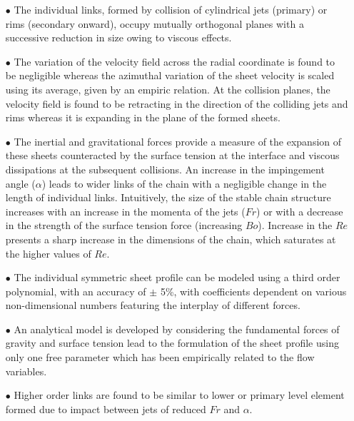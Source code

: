\begin{enumerate}
\item [$\bullet$] The individual links, formed by collision of cylindrical jets (primary) or rims (secondary onward), occupy mutually orthogonal planes with a successive reduction in size owing to viscous effects. 
\item [$\bullet$] The variation of the velocity field across the radial coordinate is found to be negligible whereas the azimuthal variation of the sheet velocity is scaled using its average, given by an empiric relation. At the collision planes, the velocity field is found to be retracting in the direction of the colliding jets and rims whereas it is expanding in the plane of the formed sheets.
\item [$\bullet$] The inertial and gravitational forces provide a measure of the expansion of these sheets counteracted by the surface tension at the interface and viscous dissipations at the subsequent collisions. An increase in the impingement angle ($\alpha$) leads to wider links of the chain with a negligible change in the length of individual links. Intuitively, the size of the stable chain structure increases with an increase in the momenta of the jets ($Fr$) or with a decrease in the strength of the surface tension force (increasing $Bo$). Increase in the $Re$ presents a sharp increase in the dimensions of the chain, which saturates at the higher values of $Re$.
\item [$\bullet$] The individual symmetric sheet profile can be modeled using a third order polynomial, with an accuracy of $\pm$ 5\%, with coefficients dependent on various non-dimensional numbers featuring the interplay of different forces.
\item [$\bullet$] An analytical model is developed by considering the fundamental forces of gravity and surface tension lead to the formulation of the sheet profile using only one free parameter which has been empirically related to the flow variables.
\item [$\bullet$] Higher order links are found to be similar to lower or primary level element formed due to impact between jets of reduced $Fr$ and $\alpha$. 
\end{enumerate}
